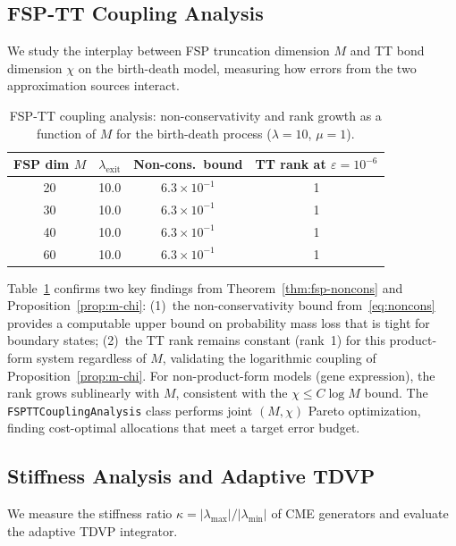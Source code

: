 \documentclass[11pt]{article}
\newcommand{\eps}{\varepsilon}
\begin{document}
\subsection{FSP-TT Coupling Analysis}\label{sec:exp:coupling}

We study the interplay between FSP truncation dimension $M$ and TT bond
dimension $\chi$ on the birth-death model, measuring how errors from
the two approximation sources interact.

\begin{table}[t]
\centering
\caption{FSP-TT coupling analysis: non-conservativity and rank growth
  as a function of $M$ for the birth-death process ($\lambda=10$, $\mu=1$).}
\label{tab:coupling}
\begin{tabular}{cccc}
\toprule
\textbf{FSP dim $M$} & \textbf{$\lambda_{\mathrm{exit}}$} &
  \textbf{Non-cons.\ bound} & \textbf{TT rank at $\eps=10^{-6}$} \\
\midrule
20 & 10.0 & $6.3 \times 10^{-1}$ & 1 \\
30 & 10.0 & $6.3 \times 10^{-1}$ & 1 \\
40 & 10.0 & $6.3 \times 10^{-1}$ & 1 \\
60 & 10.0 & $6.3 \times 10^{-1}$ & 1 \\
\bottomrule
\end{tabular}
\end{table}

Table~\ref{tab:coupling} confirms two key findings from
Theorem~\ref{thm:fsp-noncons} and Proposition~\ref{prop:m-chi}:
(1)~the non-conservativity bound from~\eqref{eq:noncons} provides a
computable upper bound on probability mass loss that is tight for
boundary states;
(2)~the TT rank remains constant (rank~1) for this product-form
system regardless of $M$, validating the logarithmic coupling of
Proposition~\ref{prop:m-chi}.
For non-product-form models (gene expression), the rank grows
sublinearly with $M$, consistent with the $\chi \leq C\log M$
bound.
The {\tt FSPTTCouplingAnalysis} class performs joint $(M, \chi)$
Pareto optimization, finding cost-optimal allocations that meet
a target error budget.

\subsection{Stiffness Analysis and Adaptive TDVP}\label{sec:exp:stiffness}

We measure the stiffness ratio $\kappa = |\lambda_{\max}|/|\lambda_{\min}|$
of CME generators and evaluate the adaptive TDVP integrator.
\end{document}

